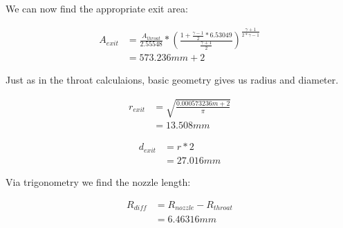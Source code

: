 \documentclass[12pt]{report}
\begin{document}
\vspace{6 mm}

We can now find the appropriate exit area:



\vspace{10 mm}

\begin{equation}
\begin{split}
\boldsymbol{\mathit{A_{exit}}} & = \frac{\boldsymbol{\mathit{A_{throat}}}}{2.55548} * {\left(\frac{1 + \frac{\boldsymbol{\mathit{\gamma}} - 1}{2} * 6.53049}{\frac{\boldsymbol{\mathit{\gamma}} + 1}{2}}\right)}^{\frac{\boldsymbol{\mathit{\gamma}} + 1}{2 * \boldsymbol{\mathit{\gamma}} - 1}}\\
 & = 573.236 mm+2 
\end{split}
\end{equation}


\vspace{10 mm}

Just as in the throat calculaions, basic geometry gives us radius and diameter.




\vspace{6 mm}

\begin{equation}
\begin{split}
\boldsymbol{\mathit{r_{exit}}} & = \sqrt{\frac{0.000573236 m+2}{\mathit{\pi}}}\\
 & = 13.508 mm 
\end{split}
\end{equation}


\vspace{10 mm}

\begin{equation}
\begin{split}
\boldsymbol{\mathit{d_{exit}}} & = \boldsymbol{\mathit{r}} * 2\\
 & = 27.016 mm 
\end{split}
\end{equation}


\vspace{6 mm}

Via trigonometry we find the nozzle length:



\vspace{6 mm}

\begin{equation}
\begin{split}
\boldsymbol{\mathit{R_{diff}}} & = \boldsymbol{\mathit{R_{nozzle}}} - \boldsymbol{\mathit{R_{throat}}}\\
 & = 6.46316 mm 
\end{split}
\end{equation}
\end{document}
